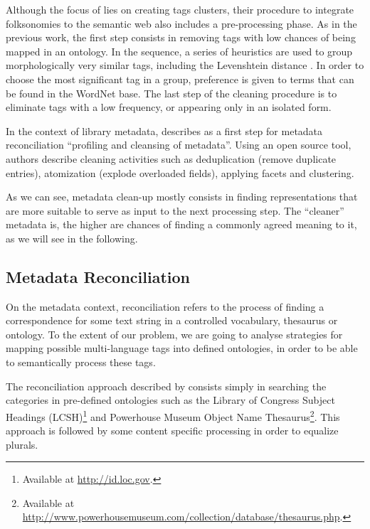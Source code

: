 Although the focus of  lies on creating tags clusters, their procedure to integrate folksonomies to the semantic web also includes a pre-processing phase.
As in the previous work, the first step consists in removing tags with low chances of being mapped in an ontology.
In the sequence, a series of heuristics are used to group morphologically very similar tags, including the Levenshtein distance \cite{Navarro2001}.
In order to choose the most significant tag in a group, preference is given to terms that can be found in the WordNet base.
The last step of the cleaning procedure is to eliminate tags with a low frequency, or appearing only in an isolated form.

In the context of library metadata,  describes as a first step for metadata reconciliation ``profiling and cleansing of metadata''.
Using an open source tool, authors describe cleaning activities such as deduplication (remove duplicate entries), atomization (explode overloaded fields), applying facets and clustering.

As we can see, metadata clean-up mostly consists in finding representations that are more suitable to serve as input to the next processing step.
The ``cleaner'' metadata is, the higher are chances of finding a commonly agreed meaning to it, as we will see in the following. 


\subsection{Metadata Reconciliation}
\label{sec:metadata_reconciliation}

On the metadata context, reconciliation refers to the process of finding a correspondence for some text string in a controlled vocabulary, thesaurus or ontology.
To the extent of our problem, we are going to analyse strategies for mapping possible multi-language tags into defined ontologies, in order to be able to semantically process these tags.

The reconciliation approach described by  consists simply in searching the categories in pre-defined ontologies such as the Library of Congress Subject Headings (LCSH)\footnote{Available at \url{http://id.loc.gov}.} and Powerhouse Museum Object Name Thesaurus\footnote{Available at \url{http://www.powerhousemuseum.com/collection/database/thesaurus.php}.}.
This approach is followed by some content specific processing in order to equalize plurals. 

